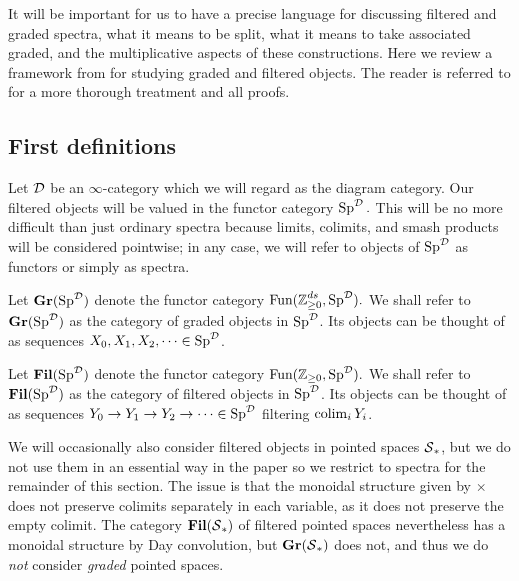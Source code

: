 
It will be important for us to have a precise language for discussing filtered and graded spectra, what it means to be split, what it means to take associated graded, and the multiplicative aspects of these constructions. Here we review a framework from \cite{LurieRot} for studying graded and filtered objects.  The reader is referred to \cite{LurieRot} for a more thorough treatment and all proofs.  

\subsection{First definitions}
Let $\operatorname{\mathcal{D}}$ be an $\infty$-category which we will regard as the diagram category.  Our filtered objects will be valued in the functor category $\operatorname{\mathrm{Sp}}^{\operatorname{\mathcal{D}}}.$  This will be no more difficult than just ordinary spectra because limits, colimits, and smash products will be considered pointwise; in any case, we will refer to objects of $\operatorname{\mathrm{Sp}}^{\operatorname{\mathcal{D}}}$ as functors or simply as spectra.  

\begin{dfn} 
Let $\operatorname{\mathbf{Gr}}(\operatorname{\mathrm{Sp}}^{\operatorname{\mathcal{D}}})$ denote the functor category $\operatorname{\text{Fun}}(\operatorname{\mathbb{Z}}_{\geq 0}^{ds}, \operatorname{\mathrm{Sp}}^{\operatorname{\mathcal{D}}}).$  We shall refer to $\operatorname{\mathbf{Gr}}(\operatorname{\mathrm{Sp}}^{\operatorname{\mathcal{D}}})$ as the category of graded objects in $\operatorname{\mathrm{Sp}}^{\operatorname{\mathcal{D}}}$.  Its objects can be thought of as sequences $X_0, X_1,X_2,\cdots \in \operatorname{\mathrm{Sp}}^{\operatorname{\mathcal{D}}}$.
\end{dfn}

\begin{dfn} 
Let $\operatorname{\mathbf{Fil}}(\operatorname{\mathrm{Sp}}^{\operatorname{\mathcal{D}}})$ denote the functor category $\operatorname{\text{Fun}}(\operatorname{\mathbb{Z}}_{\geq 0}, \operatorname{\mathrm{Sp}}^{\operatorname{\mathcal{D}}}).$  We shall refer to $\operatorname{\mathbf{Fil}}(\operatorname{\mathrm{Sp}}^{\operatorname{\mathcal{D}}})$ as the category of filtered objects in $\operatorname{\mathrm{Sp}}^{\operatorname{\mathcal{D}}}$.  Its objects can be thought of as sequences $Y_0\to Y_1\to Y_2 \to \cdots \in \operatorname{\mathrm{Sp}}^{\operatorname{\mathcal{D}}}$ filtering $\operatorname*{\mathrm{colim}}_i Y_i$.  
\end{dfn}

\begin{rmk}\label{rmk:filtspaces}
We will occasionally also consider filtered objects in pointed spaces $\operatorname{\mathcal{S}}_*$, but we do not use them in an essential way in the paper so we restrict to spectra for the remainder of this section.  The issue is that the monoidal structure given by $\times$ does not preserve colimits separately in each variable, as it does not preserve the empty colimit.  The category $\operatorname{\mathbf{Fil}}(\operatorname{\mathcal{S}}_*)$ of filtered pointed spaces nevertheless has a monoidal structure by Day convolution, but $\operatorname{\mathbf{Gr}}(\operatorname{\mathcal{S}}_*)$ does not, and thus we do \emph{not} consider \emph{graded} pointed spaces.  
\end{rmk}


